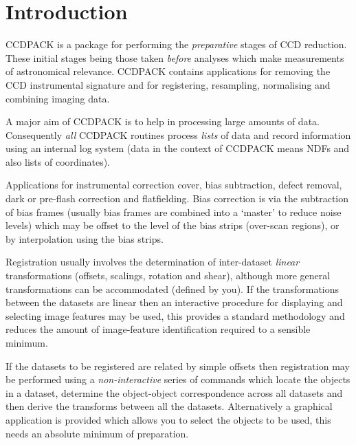 \setlength{\parskip}{0mm}
\tableofcontents
\setlength{\parskip}{\medskipamount}
\markright{\stardocname}

\newpage
\section{Introduction}

CCDPACK is a package for performing the {\em preparative} stages of CCD
reduction. These initial stages being those taken {\em before} analyses
which make measurements of astronomical relevance. CCDPACK contains
applications for removing the CCD instrumental signature and for
registering, resampling, normalising and combining imaging data.

A major aim of CCDPACK is to help in processing large amounts of data.
Consequently {\em all} CCDPACK routines process {\em lists} of data and
record information using an internal log system (data in the context of
CCDPACK means NDFs and also lists of coordinates).

Applications for instrumental correction cover, bias subtraction, defect
removal, dark or pre-flash correction and flatfielding. Bias correction
is via the subtraction of bias frames (usually bias frames are combined
into a `master' to reduce noise levels) which may be offset to the
level of the bias strips (over-scan regions), or by interpolation using
the bias strips.

Registration usually involves the determination of inter-dataset {\em
linear} transformations (offsets, scalings, rotation and shear),
although more general transformations can be accommodated (defined by
you). If the transformations between the datasets are linear then an
interactive procedure for displaying and selecting image features may be
used, this provides a standard methodology and reduces the amount of
image-feature identification required to a sensible minimum.

If the datasets to be registered are related by simple offsets then
registration may be performed using a {\em non-interactive} series of
commands which locate the objects in a dataset, determine the
object-object correspondence across all datasets and then derive the
transforms between all the datasets. Alternatively a graphical
application is provided which allows you to select the objects to be
used, this needs an absolute minimum of preparation.

